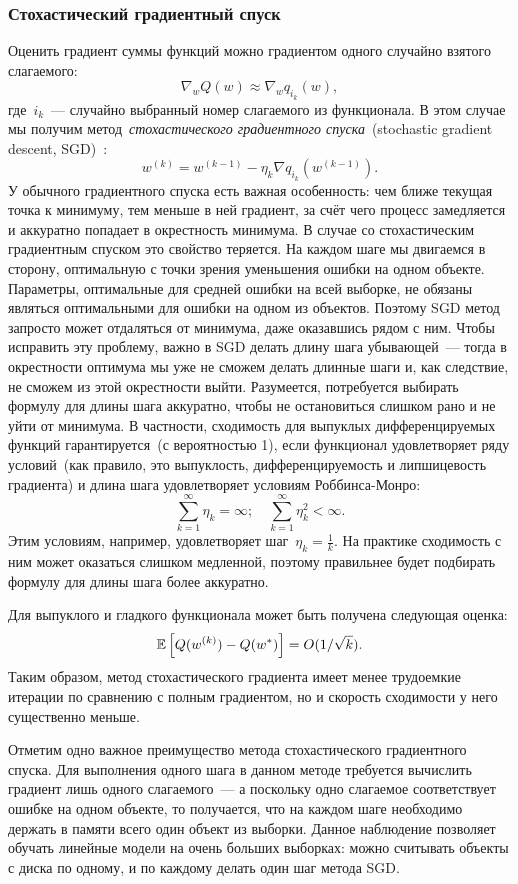 \documentclass[12pt,fleqn]{article}
\begin{document}
\subsubsection{Стохастический градиентный спуск}

Оценить градиент суммы функций можно градиентом одного случайно взятого слагаемого:
\[
    \nabla_w Q(w)
    \approx
    \nabla_w q_{i_k}(w),
\]
где~$i_k$~--- случайно выбранный номер слагаемого из функционала.
В этом случае мы получим метод~\emph{стохастического
градиентного спуска}~(stochastic gradient descent, SGD)~\cite{robbins51stochastic}:
\[
    w^{(k)} = w^{(k - 1)} - \eta_k \nabla q_{i_k}(w^{(k - 1)}).
\]
У обычного градиентного спуска есть важная особенность:
чем ближе текущая точка к минимуму, тем меньше в ней градиент,
за счёт чего процесс замедляется и аккуратно попадает в окрестность минимума.
В случае со стохастическим градиентным спуском это свойство теряется.
На каждом шаге мы двигаемся в сторону, оптимальную с точки зрения уменьшения ошибки на одном объекте.
Параметры, оптимальные для средней ошибки на всей выборке, не обязаны являться оптимальными
для ошибки на одном из объектов.
Поэтому SGD метод запросто может отдаляться от минимума, даже оказавшись рядом с ним.
Чтобы исправить эту проблему, важно в SGD делать длину шага убывающей~---
тогда в окрестности оптимума мы уже не сможем делать длинные шаги и, как следствие,
не сможем из этой окрестности выйти.
Разумеется, потребуется выбирать формулу для длины шага аккуратно, чтобы не остановиться слишком рано
и не уйти от минимума.
В частности, сходимость для выпуклых дифференцируемых функций гарантируется~(с вероятностью 1),
если функционал удовлетворяет ряду условий~(как правило, это выпуклость, дифференцируемость и липшицевость градиента)
и длина шага удовлетворяет условиям Роббинса-Монро:
\[
    \sum_{k = 1}^{\infty} \eta_k = \infty; \quad
    \sum_{k = 1}^{\infty} \eta_k^2 < \infty.
\]
Этим условиям, например, удовлетворяет шаг~$\eta_k = \frac{1}{k}$.
На практике сходимость с ним может оказаться слишком медленной,
поэтому правильнее будет подбирать формулу для длины шага более аккуратно.

Для выпуклого и гладкого функционала может быть получена
следующая оценка:
\[
    \mathbb{E} \left[
        Q(w^{(k)}) - Q(w^*)
    \right]
    =
    O(1 / \sqrt{k}).
\]
Таким образом, метод стохастического градиента имеет менее
трудоемкие итерации по сравнению с полным градиентом,
но и скорость сходимости у него существенно меньше.

Отметим одно важное преимущество метода стохастического градиентного спуска.
Для выполнения одного шага в данном методе требуется вычислить градиент лишь одного слагаемого~---
а поскольку одно слагаемое соответствует ошибке на одном объекте,
то получается, что на каждом шаге необходимо держать в памяти всего один объект из выборки.
Данное наблюдение позволяет обучать линейные модели на очень больших выборках:
можно считывать объекты с диска по одному, и по каждому делать один шаг метода SGD.
\end{document}
